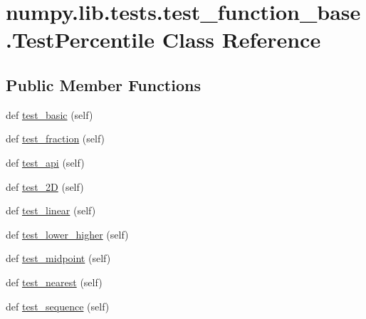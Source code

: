 \hypertarget{classnumpy_1_1lib_1_1tests_1_1test__function__base_1_1TestPercentile}{}\section{numpy.\+lib.\+tests.\+test\+\_\+function\+\_\+base.\+Test\+Percentile Class Reference}
\label{classnumpy_1_1lib_1_1tests_1_1test__function__base_1_1TestPercentile}
\subsection*{Public Member Functions}
\begin{DoxyCompactItemize}
\item 
def \hyperlink{classnumpy_1_1lib_1_1tests_1_1test__function__base_1_1TestPercentile_a8cb1e9d33e64409b8f5e41d9b3c7ed18}{test\+\_\+basic} (self)
\item 
def \hyperlink{classnumpy_1_1lib_1_1tests_1_1test__function__base_1_1TestPercentile_a8161b10ea3c8433fdfc52925d6227cd7}{test\+\_\+fraction} (self)
\item 
def \hyperlink{classnumpy_1_1lib_1_1tests_1_1test__function__base_1_1TestPercentile_af5f028a0071e86f5827519b3f218d6da}{test\+\_\+api} (self)
\item 
def \hyperlink{classnumpy_1_1lib_1_1tests_1_1test__function__base_1_1TestPercentile_aae8045e04e5fa95f36cf44f15e115605}{test\+\_\+2D} (self)
\item 
def \hyperlink{classnumpy_1_1lib_1_1tests_1_1test__function__base_1_1TestPercentile_ae841767794584be242e0e968c523fac6}{test\+\_\+linear} (self)
\item 
def \hyperlink{classnumpy_1_1lib_1_1tests_1_1test__function__base_1_1TestPercentile_abc0a89b955fb920ca1f83710d3d017be}{test\+\_\+lower\+\_\+higher} (self)
\item 
def \hyperlink{classnumpy_1_1lib_1_1tests_1_1test__function__base_1_1TestPercentile_a823d4b8ee1760a97aab32f860e59512a}{test\+\_\+midpoint} (self)
\item 
def \hyperlink{classnumpy_1_1lib_1_1tests_1_1test__function__base_1_1TestPercentile_a87b1060c5642bbc183b9bdefd34ddf25}{test\+\_\+nearest} (self)
\item 
def \hyperlink{classnumpy_1_1lib_1_1tests_1_1test__function__base_1_1TestPercentile_ac8d166f8d81e2fb45d1c3a0320e0d7dc}{test\+\_\+sequence} (self)
\item 

\end{DoxyCompactItemize}

